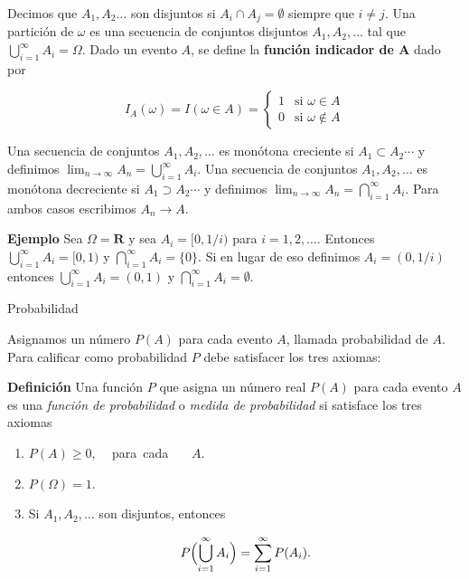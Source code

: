\documentclass{article}\usepackage[]{graphicx}\usepackage[]{color}
\begin{document}
\vspace{0.3cm}


Decimos que $A_1, A_2 \dots$ son disjuntos si $A_i \cap A_j = \emptyset$ siempre que $i \neq j$. Una partici\'on de $\omega$ es una secuencia de conjuntos disjuntos $A_1, A_2, \dots $ tal que  $\bigcup\limits_{i = 1}^{\infty} A_i =\Omega$. Dado un evento $A$, se define la \textbf{funci\'on indicador de A} dado por 

\[
 I_A(\omega) = I(\omega \in A) =
  \begin{cases}
   1  & \text{si  }  \omega \in A \\
   0       & \text{si  } \omega \notin A
  \end{cases}
\]

Una secuencia de conjuntos $A_1, A_2, \dots $ es mon\'otona creciente si $A_1 \subset A_2 \cdots$ y definimos $\lim_{n \rightarrow \infty}A_n = \bigcup\limits_{i= 1}^{\infty}A_i$. Una secuencia de conjuntos $A_1, A_2, \dots $ es mon\'otona decreciente si $A_1 \supset A_2 \cdots$ y definimos $\lim_{n \rightarrow \infty}A_n = \bigcap\limits_{i= 1}^{\infty}A_i$. Para ambos casos escribimos $A_n \rightarrow A$.

\vspace{0.3cm}

\textbf{Ejemplo} Sea $\Omega = \mathbf{R}$ y sea $A_i = [0, 1/i)$ para $i = 1,2, \dots $. Entonces $\bigcup\limits_{i= 1}^{\infty}A_i = [0,1)$ y $\bigcap\limits_{i= 1}^{\infty}A_i = \{ 0 \}$. Si en lugar de eso definimos $A_i = (0, 1/i)$ entonces $\bigcup\limits_{i= 1}^{\infty}A_i = (0,1)$ y $\bigcap\limits_{i= 1}^{\infty}A_i = \emptyset$.


\vspace{0.5cm}

{\large Probabilidad}

\vspace{0.3cm}

Asignamos un n\'umero $P(A)$ para cada evento $A$, llamada probabilidad de $A$. Para calificar como probabilidad $P$ debe satisfacer los tres axiomas:

\vspace{0.3cm}

\textbf{Definici\'on} Una funci\'on $P$ que asigna un n\'umero real $P(A)$ para cada evento $A$ es una \textit{funci\'on de probabilidad} o \textit{medida de probabilidad} si satisface los tres axiomas

\begin{enumerate}
\item $P(A) \geq 0$, \ \ \mbox{para cada } \ \ $A$.
\item $P(\Omega) = 1$.
\item Si $A_1, A_2, \dots$ son disjuntos, entonces

\[
P\Bigl(\bigcup\limits_{i= 1}^{\infty}A_i \Bigr) = \sum_{i = 1}^{\infty}P(A_i).
\]
\end{enumerate}
\end{document}
